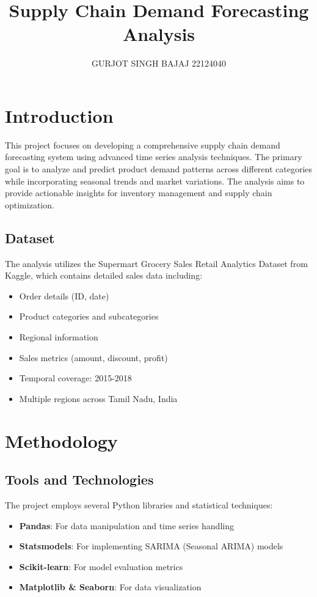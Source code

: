 \documentclass[11pt,a4paper]{article}
\title{Supply Chain Demand Forecasting Analysis}
\author{GURJOT SINGH BAJAJ 22124040}
\date{}
\begin{document}
\maketitle

\section{Introduction}
This project focuses on developing a comprehensive supply chain demand forecasting system using advanced time series analysis techniques. The primary goal is to analyze and predict product demand patterns across different categories while incorporating seasonal trends and market variations. The analysis aims to provide actionable insights for inventory management and supply chain optimization.

\subsection{Dataset}
The analysis utilizes the Supermart Grocery Sales Retail Analytics Dataset from Kaggle, which contains detailed sales data including:
\begin{itemize}
    \item Order details (ID, date)
    \item Product categories and subcategories
    \item Regional information
    \item Sales metrics (amount, discount, profit)
    \item Temporal coverage: 2015-2018
    \item Multiple regions across Tamil Nadu, India
\end{itemize}

\section{Methodology}
\subsection{Tools and Technologies}
The project employs several Python libraries and statistical techniques:
\begin{itemize}
    \item \textbf{Pandas}: For data manipulation and time series handling
    \item \textbf{Statsmodels}: For implementing SARIMA (Seasonal ARIMA) models
    \item \textbf{Scikit-learn}: For model evaluation metrics
    \item \textbf{Matplotlib \& Seaborn}: For data visualization
\end{itemize}
\end{document}
